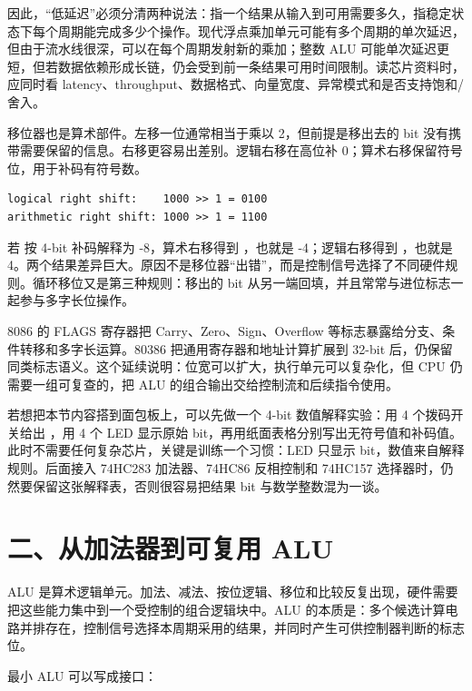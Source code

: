 因此，“低延迟”必须分清两种说法：指一个结果从输入到可用需要多久，指稳定状态下每个周期能完成多少个操作。现代浮点乘加单元可能有多个周期的单次延迟，但由于流水线很深，可以在每个周期发射新的乘加；整数 ALU 可能单次延迟更短，但若数据依赖形成长链，仍会受到前一条结果可用时间限制。读芯片资料时，应同时看 latency、throughput、数据格式、向量宽度、异常模式和是否支持饱和/舍入。

移位器也是算术部件。左移一位通常相当于乘以 2，但前提是移出去的 bit 没有携带需要保留的信息。右移更容易出差别。逻辑右移在高位补 0；算术右移保留符号位，用于补码有符号数。

\begin{lstlisting}
logical right shift:    1000 >> 1 = 0100
arithmetic right shift: 1000 >> 1 = 1100
\end{lstlisting}

若  按 4-bit 补码解释为 -8，算术右移得到 ，也就是 -4；逻辑右移得到 ，也就是 4。两个结果差异巨大。原因不是移位器“出错”，而是控制信号选择了不同硬件规则。循环移位又是第三种规则：移出的 bit 从另一端回填，并且常常与进位标志一起参与多字长位操作。

\begin{chipcase}
8086 的 FLAGS 寄存器把 Carry、Zero、Sign、Overflow 等标志暴露给分支、条件转移和多字长运算。80386 把通用寄存器和地址计算扩展到 32-bit 后，仍保留同类标志语义。这个延续说明：位宽可以扩大，执行单元可以复杂化，但 CPU 仍需要一组可复查的，把 ALU 的组合输出交给控制流和后续指令使用。
\end{chipcase}

若想把本节内容搭到面包板上，可以先做一个 4-bit 数值解释实验：用 4 个拨码开关给出 ，用 4 个 LED 显示原始 bit，再用纸面表格分别写出无符号值和补码值。此时不需要任何复杂芯片，关键是训练一个习惯：LED 只显示 bit，数值来自解释规则。后面接入 74HC283 加法器、74HC86 反相控制和 74HC157 选择器时，仍然要保留这张解释表，否则很容易把结果 bit 与数学整数混为一谈。

\section{二、从加法器到可复用 ALU}

ALU 是算术逻辑单元。加法、减法、按位逻辑、移位和比较反复出现，硬件需要把这些能力集中到一个受控制的组合逻辑块中。ALU 的本质是：多个候选计算电路并排存在，控制信号选择本周期采用的结果，并同时产生可供控制器判断的标志位。

最小 ALU 可以写成接口：

